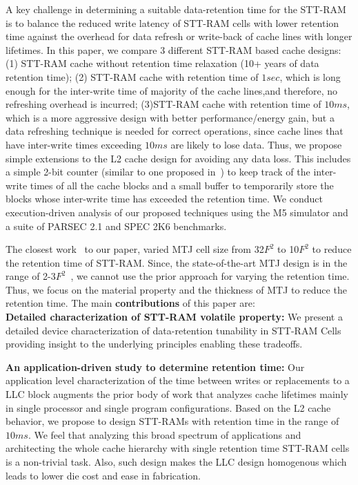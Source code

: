 A key challenge in determining a suitable data-retention time for the STT-RAM is to balance the
reduced write latency of STT-RAM cells with lower retention time against the overhead for data refresh or
write-back of cache lines with longer lifetimes. In this paper, we compare 3 different STT-RAM based
cache designs: (1) STT-RAM cache without retention time relaxation (10+ years of data retention
time); (2) STT-RAM cache with retention time of $1sec$, which is long enough for the inter-write time of
majority of the cache lines,and therefore, no refreshing overhead is incurred; (3)STT-RAM cache with
retention time of $10ms$, which is a more aggressive design with better performance/energy gain, but a
data refreshing technique is needed for correct operations, since cache lines that have inter-write times
exceeding $10ms$ are likely to lose data. Thus, we propose simple extensions to the L2 cache design
for avoiding any data loss. This includes a simple 2-bit counter (similar to one proposed
in~\cite{cache-decay-2001}) to keep track of the inter-write times of all the cache blocks and a small buffer
to temporarily store the blocks whose inter-write time has exceeded the retention time. We conduct
execution-driven analysis of our proposed techniques using the M5 simulator and
a suite of PARSEC 2.1 and SPEC 2K6 benchmarks. 

The closest work~\cite{STTRAM:HPCA11} to our paper, varied MTJ cell size from 32$F^2$ to 10$F^2$ to reduce
the retention time of STT-RAM. Since, the state-of-the-art MTJ design is in the range of 2-3$F^2$~\cite{STTRAM:Grandis11}, we cannot use the prior approach for varying the retention time. Thus, we focus on
the material property and the thickness of MTJ to reduce the retention time. The main {\bf contributions} of this paper are: \\
\noindent\textbf{Detailed characterization of STT-RAM volatile property:} We present a detailed
device characterization of data-retention tunability in STT-RAM Cells providing insight to the
underlying principles enabling these tradeoffs. 

\noindent\textbf{An application-driven study to determine retention time:}
Our application level characterization of the time between writes or replacements to a 
LLC block augments the prior body of work that analyzes cache lifetimes mainly
in single processor and single program configurations. Based on the L2 cache behavior, 
we propose to design STT-RAMs with retention time in the range of $10ms$.
We feel that analyzing this broad spectrum of applications
and architecting the whole cache hierarchy with single retention time STT-RAM
cells is a non-trivial task. Also, such design 
makes the LLC design homogenous which leads to lower die cost and ease in fabrication.

